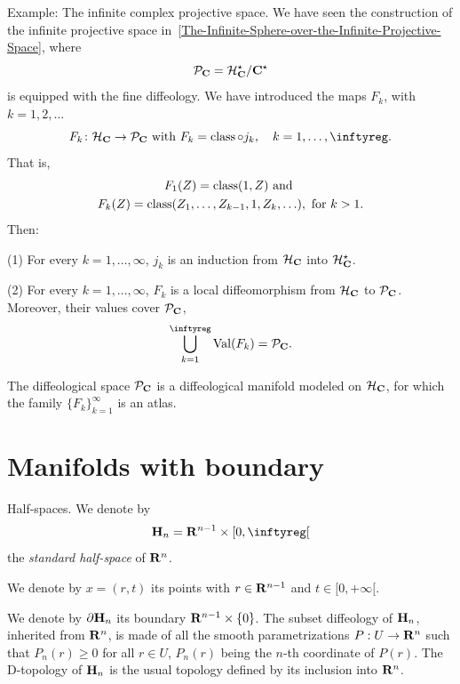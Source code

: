 \begin{Article}{Example: The infinite complex projective space.}
  \label{The-infinite-complex-projective-space}
  We have seen the construction of the infinite projective space in \textsection\,\ref{The-Infinite-Sphere-over-the-Infinite-Projective-Space},
  where
  $$%
    \cP_{\CC} = \cH_{\CC}^\star / \CC^\star
  $$%
  is equipped with the fine diffeology.
  We have introduced the maps $F_k$,
  with $k = 1,2,\ldots$
  $$%
    F_k \colon \cH_{\CC} \to \cP_{\CC}
    \SpacedText{with}
    F_k = \Class \circ j_k, \quad k=1, \ldots, \infty.
  $$%
  That is,
  \begin{multline*}
    F_1(Z) = \operatorname{class}(1,Z)
    \ \text{and}\  \\
    F_k(Z) = \operatorname{class}(Z_1,\ldots, Z_{k-1}, 1, Z_k,\ldots), \text{ for } k> 1.
    \end{multline*}
  Then:

  (1) For every $k = 1, \ldots, \infty$, $j_k$ is an induction from $\mathcal{H}_{\mathbf{C}}$ into $\mathcal{H}_{\mathbf{C}}^{\star}$.

  (2) For every $k = 1, \ldots, \infty$, $F_k$ is a local diffeomorphism from $\mathcal{H}_{\mathbf{C}}$ to $\mathcal{P}_{\mathbf{C}}$.
  Moreover,
  their values cover $\mathcal{P}_{\mathbf{C}}$,
  $$%
    \bigcup_{k=1}^\infty \Val(F_k) = \cP_{\CC}.
  $$%

   The diffeological space $\mathcal{P}_{\mathbf{C}}$ is a diffeological manifold modeled on $\mathcal{H}_{\mathbf{C}}$,
  for which the family $\{F_k\}_{k=1}^\infty$ is an atlas.

\end{Article} %


\section{Manifolds with boundary}

\begin{Article}{Half-spaces.}{}
  \label{Half-spaces}
  We denote by
  $$%
    \HH_n = \RR^{n-1} \times \LeftClosedInterval{0,\infty}
  $$%
  the \emph{standard half-space} of $\mathbf{R}^n$.

  We denote by $x=(r,t)$ its points with $r \in \mathbf{R}^{n-1}$ and $t \in [0,+\infty[$.

  We denote by $\partial {\mathbf H}_n$ its boundary $\mathbf{R}^{n-1} \times \{0\}$.
  The subset diffeology of ${\mathbf H}_n$,
  inherited from $\mathbf{R}^n$,
  is made of all the smooth parametrizations $P : U \to \mathbf{R}^n$ such that $P_n(r) \geq 0$ for all $r \in U$,
  $P_n(r)$ being the $n$-th coordinate of $P(r)$.
  The D-topology of ${\mathbf H}_n$ is the usual topology defined by its inclusion into $\mathbf{R}^n$.
\end{Article} %

